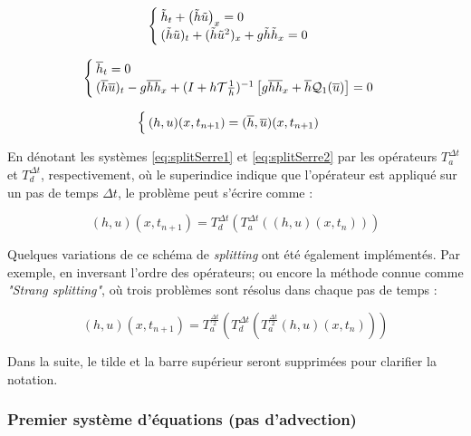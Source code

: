 \begin{equation}
	\label{eq:splitSerre1}
	\begin{cases}
		\tilde{h}_t + \left(\tilde{h}\tilde{u}\right)_x = 0 \\
		(\tilde{h}\tilde{u})_t + (\tilde{h}\tilde{u}^2)_x + g\tilde{h}\tilde{h}_x = 0 
	\end{cases}	
\end{equation}

\begin{equation}
	\label{eq:splitSerre2}
	\begin{cases}
		\overline{h}_t = 0 \\
		(\overline{h}\overline{u})_t  -g\overline{h}\overline{h}_x + (I + h\mathcal{T}\frac{1}{h})^{-1}\left[ g\overline{h}\overline{h}_x + \overline{h}\mathcal{Q}_1(\overline{u}) \right] = 0
	\end{cases}	
\end{equation}

\begin{equation*}
\begin{cases}
(h,u)(x,t_{n+1}) = (\overline{h},\overline{u})(x,t_{n+1})
\end{cases}
\end{equation*}

\indent En dénotant les systèmes \eqref{eq:splitSerre1} et  \eqref{eq:splitSerre2} par les opérateurs $T_a^{\Delta t}$ et $T_d^{\Delta t}$, respectivement, où le superindice indique que l'opérateur est appliqué sur un pas de temps  $\Delta t$, le problème peut s'écrire comme :

\begin{equation*}
(h,u)(x,t_{n+1}) = T_d^{\Delta t} \left( T_a^{\Delta t} \left((h,u)(x,t_n) \right) \right)
\end{equation*}

\indent Quelques variations de ce schéma de \emph{splitting} ont été également implémentés. Par exemple, en inversant l'ordre des opérateurs; ou encore la méthode connue comme \emph{"Strang splitting"}, où trois problèmes sont résolus dans chaque pas de temps :

\begin{equation*}
(h,u)(x,t_{n+1}) = T_a^{\frac{\Delta t}{2}} \left( T_d^{\Delta t} \left( T_a^{\frac{\Delta t}{2}} (h,u)(x,t_n) \right) \right)
\end{equation*}

\indent Dans la suite, le tilde et la barre supérieur seront supprimées pour clarifier la notation.

\subsubsection{Premier système d'équations (pas d'advection)}

